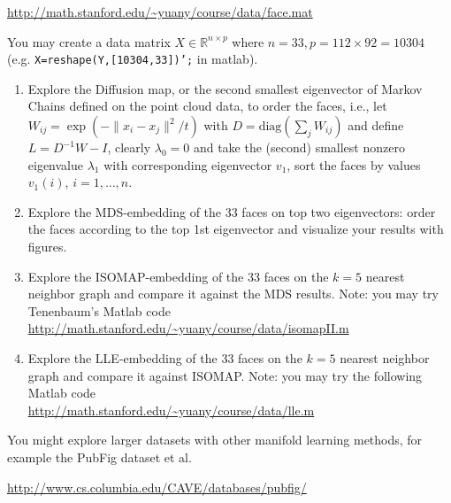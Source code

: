 \documentclass[11pt]{article}
\def\R{{\mathbb R}}
\def\diag{{\mathrm{diag}}}
\begin{document}
\url{http://math.stanford.edu/~yuany/course/data/face.mat}

You may create a data matrix $X\in \R^{n\times p}$ where $n=33,p=112\times92=10304$ \\ (e.g. {\texttt{X=reshape(Y,[10304,33])';}} in matlab).

\begin{enumerate}
\item Explore the Diffusion map, or the second smallest eigenvector of Markov Chains defined on the point cloud data, to order the faces, i.e., let $W_{ij}=\exp(-\|x_i - x_j\|^2/t)$ with $D=\diag(\sum_j W_{ij})$ and define $L=D^{-1} W - I$, clearly $\lambda_0=0$ and take the (second) smallest nonzero eigenvalue $\lambda_1$ with corresponding eigenvector $v_1$, sort the faces by values $v_1(i)$, $i=1,\ldots,n$.  
\item Explore the MDS-embedding of the 33 faces on top two eigenvectors: order the faces according to the top 1st eigenvector and visualize your results with figures. 
\item Explore the ISOMAP-embedding of the 33 faces on the $k=5$ nearest neighbor graph and compare it against the MDS results. Note: you may try Tenenbaum's Matlab code \\
{\url{http://math.stanford.edu/~yuany/course/data/isomapII.m}}
\item Explore the LLE-embedding of the 33 faces on the $k=5$ nearest neighbor graph and compare it against ISOMAP. Note: you may try the following Matlab code \\
{\url{http://math.stanford.edu/~yuany/course/data/lle.m}}
\end{enumerate}

You might explore larger datasets with other manifold learning methods, for example the PubFig dataset et al.

\url{http://www.cs.columbia.edu/CAVE/databases/pubfig/}
\end{document}
